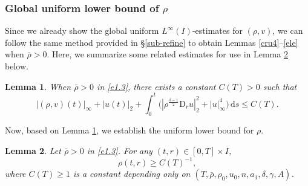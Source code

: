 \documentclass[11pt,reqno]{amsart}
\newtheorem{lem}{Lemma}[section]
\numberwithin{rk}{section}
\numberwithin{prop}{section}
\numberwithin{mydef}{section}
\numberwithin{lem}{section}
\numberwithin{equation}{section}
\numberwithin{thm}{section}
\begin{document}
\subsubsection{Global uniform lower bound of $\rho$}\label{subsub3}

Since we already show the global uniform $L^\infty(I)$-estimates for $(\rho,v)$, we can follow the same method provided in \S \ref{sub-refine} to obtain Lemmas \ref{cru4}--\ref{ele} when $\bar{\rho}>0$. Here, we summarize some related estimates for use in Lemma \ref{lemma-lowerbound} below. 
\begin{lem}\label{lemmauseful}
When $\bar{\rho}>0$ in \eqref{e1.3}, there exists a constant $C(T)>0$ such that
\begin{equation*}
|(\rho,v)(t)|_\infty+|u(t)|_2+\int_0^t \big(|\rho^\frac{\delta-1}{2}\mathrm{D}_r u|_2^2+|u|_\infty^4\big)\,\mathrm{d}s\leq C(T).
\end{equation*}
\end{lem}

Now, based on Lemma \ref{lemmauseful}, we establish the uniform lower bound for $\rho$.
\begin{lem}\label{lemma-lowerbound}
Let $\bar{\rho}>0$ in \eqref{e1.3}.
For any $(t,r)\in[0,T]\times I$,
\begin{equation*}
\rho(t,r)\geq C(T)^{-1},
\end{equation*}
where $C(T)\geq 1$ is a constant depending only on $(T,\bar\rho,\rho_0,u_0,n,a_1,\delta,\gamma,A)$.
\end{lem}
\end{document}
